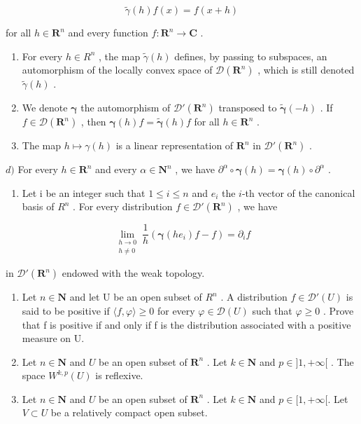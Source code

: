 \[
\widetilde {\gamma} (h) f (x) = f (x + h)
\]

for all \(h \in \mathbf{R}^n\) and every function \(f: \mathbf{R}^n \to \mathbf{C}\) .

\begin{enumerate}
\def\labelenumi{\alph{enumi})}
\item
  For every \(h \in R^{n}\) , the map \(\widetilde{\gamma}(h)\) defines, by passing to subspaces, an automorphism of the locally convex space of \(\mathcal{D}(\mathbf{R}^{n})\) , which is still denoted \(\widetilde{\gamma}(h)\) .
\item
  We denote \(\pmb{\gamma}\) the automorphism of \(\mathcal{D}'(\mathbf{R}^n)\) transposed to \(\widetilde{\pmb{\gamma}}(-h)\) . If \(f \in \mathcal{D}(\mathbf{R}^n)\) , then \(\pmb{\gamma}(h)f = \widetilde{\pmb{\gamma}}(h)f\) for all \(h \in \mathbf{R}^n\) .
\item
  The map \(h \mapsto \gamma(h)\) is a linear representation of \(\mathbf{R}^{n}\) in \(\mathcal{D}'(\mathbf{R}^{n})\) .
\end{enumerate}

\(d)\) For every \(h \in \mathbf{R}^n\) and every \(\alpha \in \mathbf{N}^n\) , we have \(\partial^\alpha \circ \boldsymbol{\gamma}(h) = \boldsymbol{\gamma}(h) \circ \partial^\alpha\) .

\begin{enumerate}
\def\labelenumi{\alph{enumi})}
\setcounter{enumi}{4}
\tightlist
\item
  Let i be an integer such that \(1 \leqslant i \leqslant n\) and \(e_{i}\) the \(i\)-th vector of the canonical basis of \(R^{n}\) . For every distribution \(f \in \mathcal{D}'(\mathbf{R}^{n})\) , we have
\end{enumerate}

\[
\lim_{\substack{h\to 0\\ h\neq 0}}\frac{1}{h} (\boldsymbol {\gamma}(he_{i})f - f) = \partial_{i}f
\]

in \(\mathcal{D}'(\mathbf{R}^n)\) endowed with the weak topology.

\begin{enumerate}
\def\labelenumi{\arabic{enumi})}
\setcounter{enumi}{7}
\item
  Let \(n \in \mathbf{N}\) and let U be an open subset of \(R^{n}\) . A distribution \(f \in \mathcal{D}'(U)\) is said to be positive if \(\langle f, \varphi \rangle \geqslant 0\) for every \(\varphi \in \mathcal{D}(U)\) such that \(\varphi \geqslant 0\) . Prove that f is positive if and only if f is the distribution associated with a positive measure on U.
\item
  Let \(n \in \mathbf{N}\) and \(U\) be an open subset of \(\mathbf{R}^n\) . Let \(k \in \mathbf{N}\) and \(p \in ]1, +\infty[\) . The space \(W^{k,p}(U)\) is reflexive.
\item
  Let \(n \in \mathbf{N}\) and \(U\) be an open subset of \(\mathbf{R}^n\) . Let \(k \in \mathbf{N}\) and \(p \in [1, +\infty[\). Let \(V \subset U\) be a relatively compact open subset.
\end{enumerate}

